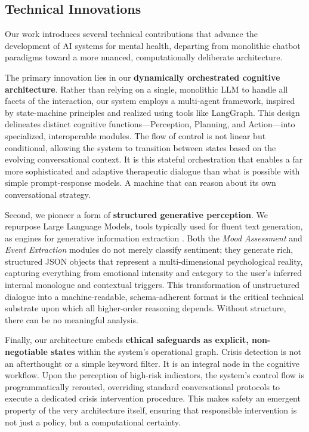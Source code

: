 \subsection{Technical Innovations}

Our work introduces several technical contributions that advance the development of AI systems for mental health, departing from monolithic chatbot paradigms toward a more nuanced, computationally deliberate architecture.

The primary innovation lies in our \textbf{dynamically orchestrated cognitive architecture}. Rather than relying on a single, monolithic LLM to handle all facets of the interaction, our system employs a multi-agent framework, inspired by state-machine principles and realized using tools like LangGraph. This design delineates distinct cognitive functions—Perception, Planning, and Action—into specialized, interoperable modules. The flow of control is not linear but conditional, allowing the system to transition between states based on the evolving conversational context. It is this stateful orchestration that enables a far more sophisticated and adaptive therapeutic dialogue than what is possible with simple prompt-response models. A machine that can reason about its own conversational strategy.

Second, we pioneer a form of \textbf{structured generative perception}. We repurpose Large Language Models, tools typically used for fluent text generation, as engines for generative information extraction \cite{xu2023large}. Both the \textit{Mood Assessment} and \textit{Event Extraction} modules do not merely classify sentiment; they generate rich, structured JSON objects that represent a multi-dimensional psychological reality, capturing everything from emotional intensity and category to the user's inferred internal monologue and contextual triggers. This transformation of unstructured dialogue into a machine-readable, schema-adherent format is the critical technical substrate upon which all higher-order reasoning depends. Without structure, there can be no meaningful analysis.

Finally, our architecture embeds \textbf{ethical safeguards as explicit, non-negotiable states} within the system's operational graph. Crisis detection is not an afterthought or a simple keyword filter. It is an integral node in the cognitive workflow. Upon the perception of high-risk indicators, the system's control flow is programmatically rerouted, overriding standard conversational protocols to execute a dedicated crisis intervention procedure. This makes safety an emergent property of the very architecture itself, ensuring that responsible intervention is not just a policy, but a computational certainty.

